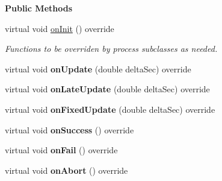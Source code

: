 \begin{Indent}\textbf{ Public Methods}\par
\begin{DoxyCompactItemize}
\item 
\mbox{\label{classrev_1_1_sprite_animation_process_aaafbab60c098f876b82ba215f396653a}} 
virtual void \mbox{\hyperlink{classrev_1_1_sprite_animation_process_aaafbab60c098f876b82ba215f396653a}{on\+Init}} () override
\begin{DoxyCompactList}\small\item\em Functions to be overriden by process subclasses as needed. \end{DoxyCompactList}\item 
\mbox{\label{classrev_1_1_sprite_animation_process_abc7303efd0009da2e7e3b22fad686885}} 
virtual void {\bfseries on\+Update} (double delta\+Sec) override
\item 
\mbox{\label{classrev_1_1_sprite_animation_process_a039d00017cda9881f76628ba58755081}} 
virtual void {\bfseries on\+Late\+Update} (double delta\+Sec) override
\item 
\mbox{\label{classrev_1_1_sprite_animation_process_a8b45c2fff6831c0be5b8ed89f9373e7c}} 
virtual void {\bfseries on\+Fixed\+Update} (double delta\+Sec) override
\item 
\mbox{\label{classrev_1_1_sprite_animation_process_adeb5a314bebbd5e506a60176c99131e4}} 
virtual void {\bfseries on\+Success} () override
\item 
\mbox{\label{classrev_1_1_sprite_animation_process_ac87358878c1be32f3117c076b6bfb50a}} 
virtual void {\bfseries on\+Fail} () override
\item 
\mbox{\label{classrev_1_1_sprite_animation_process_abba757c31d7da036671a0ad3f9101bf3}} 
virtual void {\bfseries on\+Abort} () override
\end{DoxyCompactItemize}
\end{Indent}
